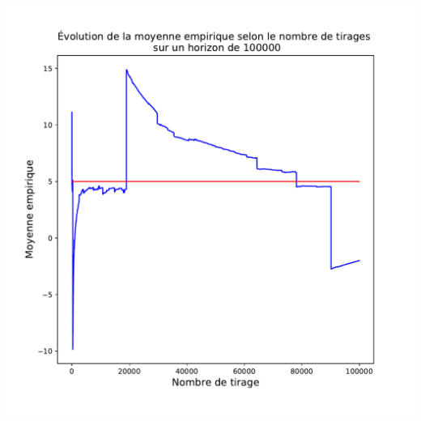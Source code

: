 \documentclass[8pt,sans,aspectratio=169]{beamer}
\begin{document}
\begin{frame}
\begin{columns}[T]
\pause

\begin{column}{0.5\linewidth}
\includegraphics[scale=0.28]{graphique-moyenne-empirique-2.pdf}
\end{column}%
\end{columns}

\end{frame}
\end{document}
